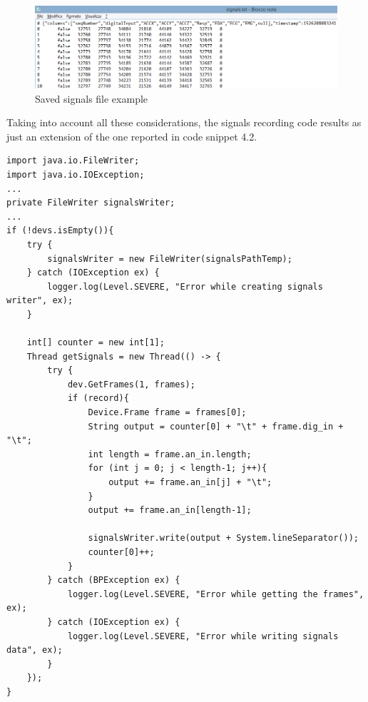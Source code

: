 \documentclass[binding=0.6cm,LaM]{sapthesis}
\begin{document}
\begin{figure}[h]
\centering
\includegraphics[scale=.41]{images/signals_file2}
\caption{Saved signals file example}
\end{figure}

Taking into account all these considerations, the signals recording code results as just an extension of the one reported in code snippet 4.2.
\\
\begin{lstlisting}[caption={Signals recording}, captionpos=b]
import java.io.FileWriter;
import java.io.IOException;
...
private FileWriter signalsWriter;
...
if (!devs.isEmpty()){
	try {
		signalsWriter = new FileWriter(signalsPathTemp);
	} catch (IOException ex) {
		logger.log(Level.SEVERE, "Error while creating signals writer", ex);
	}

	int[] counter = new int[1];
	Thread getSignals = new Thread(() -> {
		try {
			dev.GetFrames(1, frames);
			if (record){
				Device.Frame frame = frames[0];
				String output = counter[0] + "\t" + frame.dig_in + "\t";
				int length = frame.an_in.length;
				for (int j = 0; j < length-1; j++){
					output += frame.an_in[j] + "\t";
				}
				output += frame.an_in[length-1];
		
				signalsWriter.write(output + System.lineSeparator());
				counter[0]++;  
			}
		} catch (BPException ex) {
			logger.log(Level.SEVERE, "Error while getting the frames", ex);
		} catch (IOException ex) {
			logger.log(Level.SEVERE, "Error while writing signals data", ex);
		}
	});
}
        
\end{lstlisting}
\end{document}
